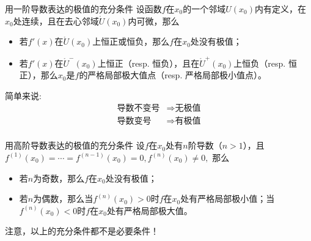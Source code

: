 \begin{frame}

\begin{block}{用一阶导数表达的极值的充分条件}
设函数$f$在$x_0$的一个邻域$U(x_0)$内有定义，在$x_0$处连续，且在去心邻域$\mathring{U}(x_0)$内可微，那么
\begin{itemize}
\item 若$f'(x)$在$\mathring{U}(x_0)$上恒正或恒负，那么$f$在$x_0$处没有极值；
\item 若$f'(x)$在$\mathring{U}^-(x_0)$上恒正（resp. 恒负），且在$\mathring{U}^+(x_0)$上恒负（resp. 恒正），那么$x_0$是$f$的严格局部极大值点（resp. 严格局部极小值点）。
\end{itemize}
\end{block}

\pause

简单来说:
\begin{align*}
\text{导数不变号} & \Longrightarrow \text{无极值} \\
\text{导数变号} & \Longrightarrow \text{有极值} \\
\end{align*}


\end{frame}


\begin{frame}

\begin{block}{用高阶导数表达的极值的充分条件}
设$f$在$x_0$处有$n$阶导数（$n>1$），且$f^{(1)}(x_0) = \cdots = f^{(n-1)}(x_0) = 0, f^{(n)}(x_0) \neq 0,$ 那么
\begin{itemize}
\item 若$n$为奇数，那么$f$在$x_0$处没有极值；
\item 若$n$为偶数，那么当$f^{(n)}(x_0) > 0$时$f$在$x_0$处有严格局部极小值；当$f^{(n)}(x_0) < 0$时$f$在$x_0$处有严格局部极大值。
\end{itemize}
\end{block}

\pause

\vspace{2em}

注意，以上的充分条件都不是必要条件！

\end{frame}


